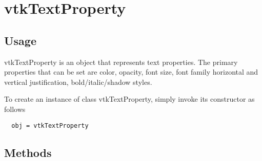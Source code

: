 \section{vtkTextProperty}

\subsection{Usage}

 vtkTextProperty is an object that represents text properties.
 The primary properties that can be set are color, opacity, font size,
 font family horizontal and vertical justification, bold/italic/shadow
 styles.

To create an instance of class vtkTextProperty, simply
invoke its constructor as follows
\begin{verbatim}
  obj = vtkTextProperty
\end{verbatim}
\subsection{Methods}

